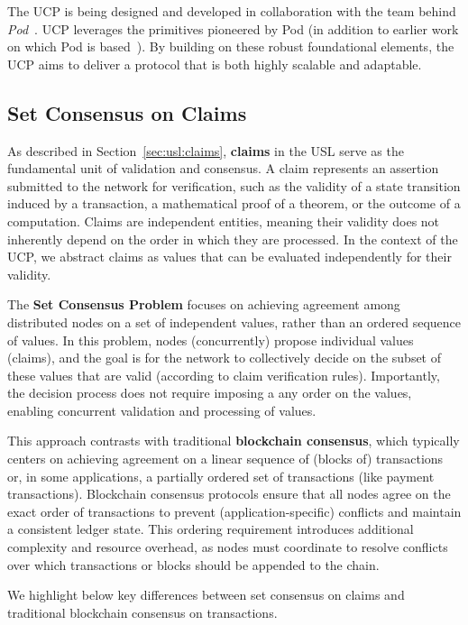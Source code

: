 \documentclass{article}
\newcommand{\UC}{UCP}
\begin{document}
The \UC{} is being designed and developed in collaboration with the team behind \textit{Pod}~\cite{AlposADZ:2025}. \UC{} leverages the primitives pioneered by Pod (in addition to earlier work on which Pod is based~\cite{BaudetBDS:2020,SliwinskiSW:2021,BrachaB:1987}). By building on these robust foundational elements, the \UC{} aims to deliver a protocol that is both highly scalable and adaptable.


\subsection{Set Consensus on Claims}
\label{sec:ucp:claim-consensus}

As described in Section~\ref{sec:usl:claims}, \textbf{claims} in the USL serve as the fundamental unit of validation and consensus. A claim represents an assertion submitted to the network for verification, such as the validity of a state transition induced by a transaction, a mathematical proof of a theorem, or the outcome of a computation. Claims are independent entities, meaning their validity does not inherently depend on the order in which they are processed. In the context of the \UC{}, we abstract claims as values that can be evaluated independently for their validity.

The \textbf{Set Consensus Problem} focuses on achieving agreement among distributed nodes on a set of independent values, rather than an ordered sequence of values. In this problem, nodes (concurrently) propose individual values (claims), and the goal is for the network to collectively decide on the subset of these values that are valid (according to claim verification rules). Importantly, the decision process does not require imposing a any order on the values, enabling concurrent validation and processing of values.

This approach contrasts with traditional \textbf{blockchain consensus}, which typically centers on achieving agreement on a linear sequence of (blocks of) transactions or, in some applications, a partially ordered set of transactions (like payment transactions). Blockchain consensus protocols ensure that all nodes agree on the exact order of transactions to prevent (application-specific) conflicts and maintain a consistent ledger state. This ordering requirement introduces additional complexity and resource overhead, as nodes must coordinate to resolve conflicts over which transactions or blocks should be appended to the chain.

We highlight below key differences between set consensus on claims and traditional blockchain consensus on transactions.
\end{document}
